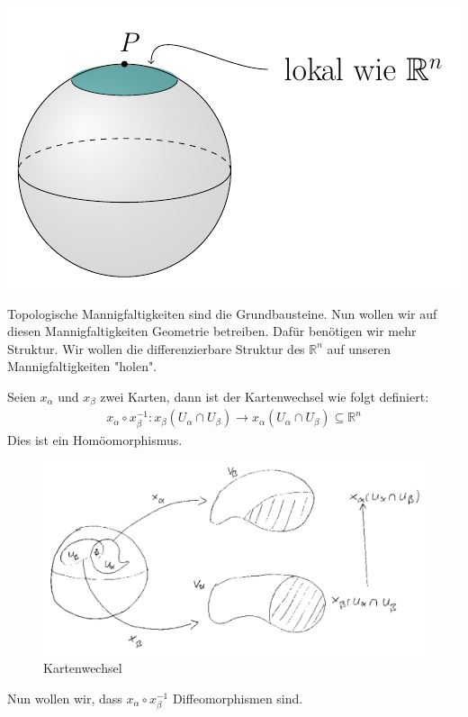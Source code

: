 \hspace{1cm}
\begin{minipage}[H]{.2\textwidth}
\vspace{-0.5cm}
\includegraphics[scale=0.5]{figures/tikz/sphere_local_rn}
\end{minipage}


Topologische Mannigfaltigkeiten sind die Grundbausteine. Nun wollen wir auf diesen Mannigfaltigkeiten Geometrie betreiben. Dafür benötigen wir mehr Struktur. Wir wollen die differenzierbare Struktur des $\mathbb{R}^n$ auf unseren Mannigfaltigkeiten "holen".

\begin{defs}[Kartenwechsel]
Seien $x_{\alpha}$ und $x_{\beta}$ zwei Karten, dann ist der Kartenwechsel wie folgt definiert: \\
\begin{align}
x_{\alpha}\circ x_{\beta}^{-1}: x_{\beta}(U_{\alpha}\cap U_{\beta}) \rightarrow x_{\alpha}(U_{\alpha}\cap U_{\beta}) \subseteq \mathbb{R}^n
\end{align}
Dies ist ein Homöomorphismus.

\begin{figure}[h]
\centering
\includegraphics[width=0.8\linewidth]{figures/scan/kartenwechsel.png}
\caption{Kartenwechsel}
\label{img:kartenwechsel}
\end{figure} 

\end{defs}
Nun wollen wir, dass $x_{\alpha}\circ x_{\beta}^{-1}$ Diffeomorphismen sind.

